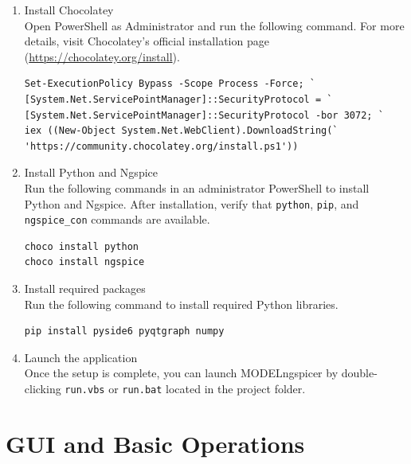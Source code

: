 \documentclass[a4paper,12pt,titlepage]{article}
\begin{document}
\begin{enumerate}
    \item Install Chocolatey\\
        Open PowerShell as Administrator and run the following command.
        For more details, visit Chocolatey's official installation page
        (\url{https://chocolatey.org/install}).

\begin{verbatim}
Set-ExecutionPolicy Bypass -Scope Process -Force; `
[System.Net.ServicePointManager]::SecurityProtocol = `
[System.Net.ServicePointManager]::SecurityProtocol -bor 3072; `
iex ((New-Object System.Net.WebClient).DownloadString(`
'https://community.chocolatey.org/install.ps1'))
\end{verbatim}

    \item Install Python and Ngspice\\
        Run the following commands in an administrator PowerShell to install Python and Ngspice.
        After installation, verify that \texttt{python}, \texttt{pip}, and \texttt{ngspice\_con}
        commands are available.

\begin{verbatim}
choco install python
choco install ngspice
\end{verbatim}

    \item Install required packages\\
        Run the following command to install required Python libraries.

\begin{verbatim}
pip install pyside6 pyqtgraph numpy
\end{verbatim}

    \item Launch the application\\
        Once the setup is complete, you can launch MODELngspicer by double-clicking
        \texttt{run.vbs} or \texttt{run.bat} located in the project folder.

\end{enumerate}

\section{GUI and Basic Operations}
\end{document}
